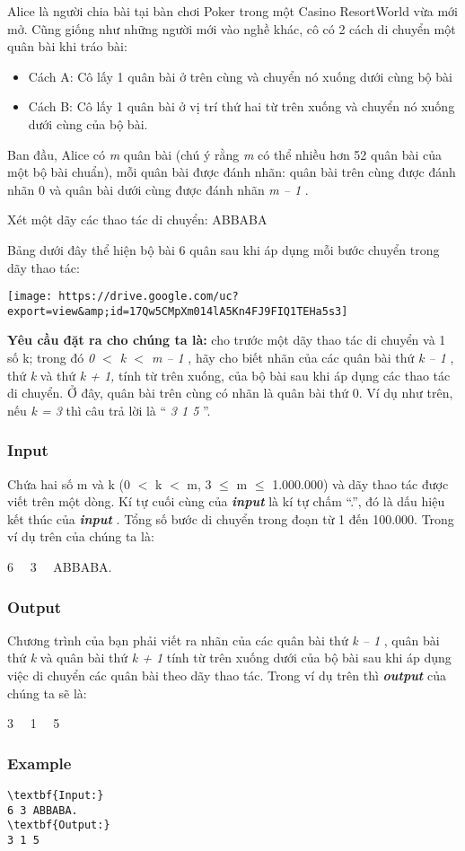 

Alice là người chia bài tại bàn chơi Poker trong một Casino ResortWorld vừa mới mở. Cũng giống như những người mới vào nghề khác, cô có 2 cách di chuyển một quân bài khi tráo bài:
\begin{itemize}
	\item Cách A: Cô lấy 1 quân bài ở trên cùng và chuyển nó xuống dưới cùng bộ bài
	\item Cách B: Cô lấy 1 quân bài ở vị trí thứ hai từ trên xuống và chuyển nó xuống dưới cùng của bộ bài.
\end{itemize}

Ban đầu, Alice có \emph{ m } quân bài (chú ý rằng \emph{ m } có thể nhiều hơn 52 quân bài của một bộ bài chuẩn), mỗi quân bài được đánh nhãn: quân bài trên cùng được đánh nhãn 0 và quân bài dưới cùng được đánh nhãn \emph{ m – 1 } .

Xét một dãy các thao tác di chuyển: ABBABA

Bảng dưới đây thể hiện bộ bài 6 quân sau khi áp dụng mỗi bước chuyển trong dãy thao tác:


\texttt{[image: https://drive.google.com/uc?export=view\&amp;id=17Qw5CMpXm014lA5Kn4FJ9FIQ1TEHa5s3]}

\textbf{Yêu cầu đặt ra cho chúng ta là: } cho trước một dãy thao tác di chuyển và 1 số k; trong đó \emph{ 0 $<$ k $<$ m – 1 } , hãy cho biết nhãn của các quân bài thứ \emph{ k – 1 } , thứ \emph{ k } và thứ \emph{ k + 1, } tính từ trên xuống, của bộ bài sau khi áp dụng các thao tác di chuyển. Ở đây, quân bài trên cùng có nhãn là quân bài thứ 0. Ví dụ như trên, nếu \emph{ k = 3 } thì câu trả lời là “ \emph{ 3 1 5 } ”.

\subsubsection{Input}

Chứa hai số m và k (0 $<$ k $<$ m, 3  $\le$  m  $\le$  1.000.000) và dãy thao tác được viết trên một dòng. Kí tự cuối cùng của \textbf{\emph{ input }} là kí tự chấm “.”, đó là dấu hiệu kết thúc của \textbf{\emph{ input }} . Tổng số bước di chuyển trong đoạn từ 1 đến 100.000. Trong ví dụ trên của chúng ta là:

6   3   ABBABA.

\subsubsection{Output}

Chương trình của bạn phải viết ra nhãn của các quân bài thứ \emph{ k – 1 } , quân bài thứ \emph{ k } và quân bài thứ \emph{ k + 1 } tính từ trên xuống dưới của bộ bài sau khi áp dụng việc di chuyển các quân bài theo dãy thao tác. Trong ví dụ trên thì \textbf{\emph{ output }} của chúng ta sẽ là:

3   1   5

\subsubsection{Example}
\begin{verbatim}
\textbf{Input:}
6 3 ABBABA.
\textbf{Output:}
3 1 5\end{verbatim}
